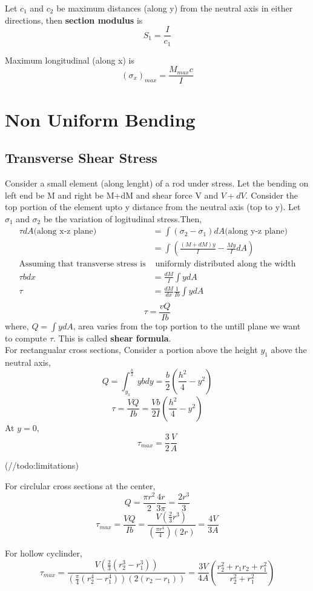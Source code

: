 \documentclass{article}
\begin{document}
		Let $c_1$ and $c_2$ be maximum distances (along y) from the neutral axis in either directions, then \textbf{section modulus} is 
		\[S_1 = \frac{I}{c_1}\]

		Maximum longitudinal (along x) is
		\[\boxed{(\sigma_x)_{max} = \frac{M_{max}c}{I}}\]

\section{Non Uniform Bending}
	\subsection{Transverse Shear Stress}
		Consider a small element (along lenght) of a rod under stress. Let the bending on left end be M and right be M+dM and shear force V and $V+dV$. Consider the top portion of the element upto y distance from the neutral axis (top to y). Let $\sigma_1$ and $\sigma_2$ be the variation of logitudinal stress.Then, 
		\begin{align*}
			\tau dA \text{(along x-z plane}) &= \int (\sigma_2 - \sigma_1) dA \text{(along y-z plane)}\\
											 &= \int (\frac{(M+dM)y}{I} - \frac{My}{I} dA  )\\
								\text{Assuming that transverse stress is} & \text{ uniformly distributed along the width}\\
									\tau bdx &= \frac{dM}{I} \int ydA \\
										\tau &= \frac{dM}{dx} \frac{1}{Ib} \int ydA\\
		\end{align*}
		\[\boxed{\tau = \frac{vQ}{Ib}}\]
		where, $Q=\int ydA$, area varies from the top portion to the untill plane we want to compute $\tau$. This is called \textbf{shear formula}.\\


		For rectangualar cross sections, Consider a portion above the height $y_1$ above the neutral axis,
		\[Q = \int_{y_1}^{\frac{h}{2}} ybdy = \frac{b}{2}\left(\frac{h^2}{4}- y^2 \right)\]
		\[\tau= \frac{VQ}{Ib} = \frac{Vb}{2I}\left(\frac{h^2}{4}- y^2 \right)\]
		At $y=0$,
		\[\tau_{max} = \frac{3}{2} \frac{V}{A}\]

		(//todo:limitations)

		For circlular cross sections at the center, 
		\[Q = \frac{\pi r^2}{2}\frac{4r}{3\pi} = \frac{2r^3}{3}\]
		\[\tau_{max} = \frac{VQ}{Ib} = \frac{V(\frac{2}{3}r^3)}{(\frac{\pi r^4}{4})(2r)} = \frac{4V}{3A}\]

		For hollow cyclinder, 
		\[\tau_{max} = \frac{V (\frac{2}{3}(r_2^3 -r_1^3))}{(\frac{\pi}{4}(r_2^4 - r_1^4))(2(r_2-r_1))}= \frac{3V}{4A} \left( \frac{r_2^2 + r_1 r_2 + r_1^2}{r_2^2+r_1^2} \right)\]
\end{document}
